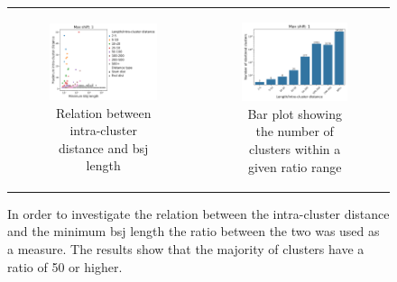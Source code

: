 \begin{figure}[ht]
    \begin{tabular}{cc}
        \begin{subfigure}{0.5\textwidth}
            \centering

            \includegraphics[width=\linewidth]{chapters/4_results_and_discussion/figures/detection/distances/diff_1_scatter.png}
            \caption{Relation between intra-cluster distance and \gls{bsj}
                length}
            \label{fig:clustering_scatter}
        \end{subfigure} &
        \begin{subfigure}{0.5\textwidth}
            \centering

            \includegraphics[width=\linewidth]{chapters/4_results_and_discussion/figures/detection/distances/diff_1_bar.png}
            \caption{Bar plot showing the number of clusters within a given
                ratio range}
            \label{fig:clustering_bar}
        \end{subfigure}
    \end{tabular}
    \caption{In order to investigate the relation between the intra-cluster
        distance and the minimum \gls{bsj} length the ratio between the two was
        used as a measure.
        The results show that the majority of clusters have a ratio of 50 or higher.
    }
    \label{fig:clustering}
\end{figure}

